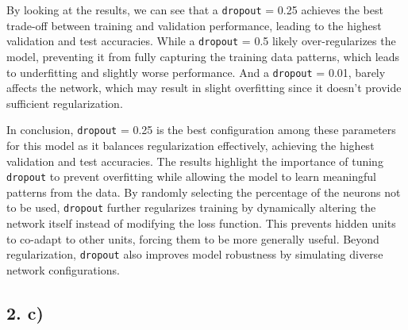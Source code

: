 \documentclass[a4paper, 12pt]{article}
\begin{document}
By looking at the results, we can see that a \texttt{dropout} = 0.25 achieves the best trade-off between training and validation performance, leading to the highest validation and test accuracies. While a \texttt{dropout} = 0.5 likely over-regularizes the model, preventing it from fully capturing the training data patterns, which leads to underfitting and slightly worse performance. And a \texttt{dropout} = 0.01, barely affects the network, which may result in slight overfitting since it doesn't provide sufficient regularization.


In conclusion, \texttt{dropout} = 0.25 is the best configuration among these parameters for this model as it balances regularization effectively, achieving the highest validation and test accuracies. The results highlight the importance of tuning \texttt{dropout} to prevent overfitting while allowing the model to learn meaningful patterns from the data. By randomly selecting the percentage of the neurons not to be used, \texttt{dropout} further regularizes training by dynamically altering the network itself instead of modifying the loss function. This prevents hidden units to co-adapt to other units, forcing them to be more generally useful. Beyond regularization, \texttt{dropout} also improves model robustness by simulating diverse network configurations.

\subsection*{2. c)}
\end{document}
